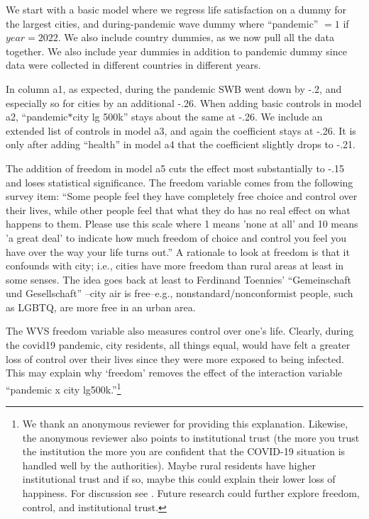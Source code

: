 \documentclass[10pt, letterpaper]{article}
\begin{document}
\begin{spacing}{1.4}
 We start with a basic model where we regress life satisfaction on a dummy for the largest cities, and during-pandemic wave dummy where ``pandemic'' $=1$ if $year=2022$. We also include country dummies, as we now pull all the data together. We also include year dummies in addition to pandemic dummy since data were collected in different countries in different years. 

In column a1, as expected,  during the pandemic SWB went down by -.2, and
especially so for cities by an additional -.26. When adding basic controls in
model a2, ``pandemic$*$city lg 500k'' stays about the same at -.26. We include an extended
list of controls in model a3, and again the coefficient stays at -.26. It is only
after adding ``health'' in model a4 that the coefficient slightly drops to
-.21.

The addition of freedom in model a5 cuts the effect most substantially to -.15 and loses statistical significance. 
{The freedom variable comes from the following survey item: ``Some people feel they
  have completely free choice and control over their lives, while other people
  feel that what they do has no real effect on what happens to them. Please use
  this scale where 1 means 'none at all' and 10 means 'a great deal' to indicate
  how much freedom of choice and control you feel you have over the way your
  life turns out.'' A rationale to look at freedom is that it confounds with
  city; i.e., cities have more freedom than rural areas at least in some senses. The idea
  goes back at least to Ferdinand Toennies' ``Gemeinschaft und Gesellschaft'' \citep{tonnies57}--city air is free--e.g., nonstandard/nonconformist people, such as LGBTQ, are more free in an urban area.}

The WVS freedom variable also measures control over one's life. Clearly, during
  the covid19 pandemic, city residents, all things equal, would have felt a greater loss of
  control over their lives since they were more exposed to being infected. This
  may explain why  `freedom' removes the effect of the interaction variable ``pandemic
  x city lg500k.''\footnote{We thank an anonymous reviewer for providing this
    explanation. Likewise, the anonymous reviewer also points to institutional trust (the more you trust the institution the more you are confident that the COVID-19 situation is handled well by the authorities). Maybe rural residents have higher institutional trust and if
    so, maybe this could explain their lower loss of happiness. For discussion
    see \citet{sorensen2022role}. Future research could further explore freedom,
    control, and institutional trust.} 


\end{spacing}
\end{document}
